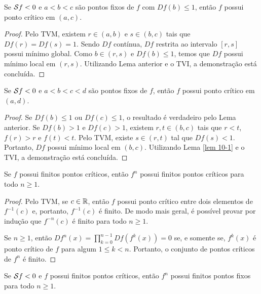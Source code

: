 \begin{lemma}\label{lem 10-2}
Se $\mathcal{S} f < 0$ e $a<b<c$ são pontos fixos de $f$ com $D f(b) \leq 1$, então $f$ possui ponto crítico em $(a, c)$.
\end{lemma}

\begin{proof}
Pelo TVM, existem $r \in (a,b)$ e $s \in (b,c)$  tais que $D f(r) = D f(s) = 1$.
Sendo $D f$ contínua, $D f$ restrita ao intervalo $[r,s]$ possui mínimo global.
Como $b \in (r,s)$ e $D f(b) \leq 1$, temos que $D f$ possui mínimo local em $(r,s)$.
Utilizando Lema anterior e o TVI, a demonstração está concluída.
\end{proof}

\begin{lemma}\label{lem 10-3}
Se $\mathcal{S} f < 0$ e $a<b<c<d$ são pontos fixos de $f$, então $f$ possui ponto crítico em $(a,d)$.
\end{lemma}

\begin{proof}
Se $D f(b) \leq 1$ ou $D f(c) \leq 1$, o resultado é verdadeiro pelo Lema anterior.
Se $D f(b) > 1$ e $D f(c) > 1$, existem $r, t \in (b,c)$ tais que $r<t$, $f(r) > r$ e $f(t) < t$.
Pelo TVM, existe $s \in (r,t)$ tal que $D f(s) < 1$.
Portanto, $D f$ possui mínimo local em $(b,c)$.
Utilizando Lema \ref{lem 10-1} e o TVI, a demonstração está concluída.
\end{proof}

\begin{lemma}\label{lem 10-4}
Se $f$ possui finitos pontos críticos, então $f^n$ possui finitos pontos críticos para todo $n \geq 1$.
\end{lemma}
\begin{proof}
Pelo TVM, se $c \in \mathbb{R}$, então $f$ possui ponto crítico entre dois elementos de $f^{-1}(c)$ e, portanto, $f^{-1}(c)$ é finito.
De modo mais geral, é possível provar por indução que $f^{-n}(c)$ é finito para todo $n \geq 1$.

Se $n \geq 1$, então $D f^n(x) = \prod_{k=0}^{n-1} D f(f^k(x)) = 0$ se, e somente se, $f^k(x)$ é ponto crítico de $f$ para algum $1 \leq k < n$.
Portanto, o conjunto de pontos críticos de $f^n$ é finito.
\end{proof}

\begin{lemma}
Se $\mathcal{S} f < 0$ e $f$ possui finitos pontos críticos, então $f^n$ possui finitos pontos fixos para todo $n \geq 1$.
\end{lemma}

